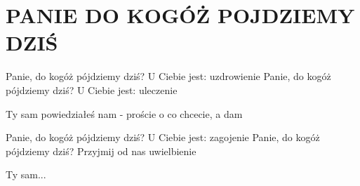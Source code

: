 \documentclass[../../../songbook.tex]{subfiles}
\begin{document}
\TabPositions{8cm} %
\section*{PANIE DO KOGÓŻ POJDZIEMY DZIŚ}
{}
\vspace{0.5cm}
Panie, do kogóż pójdziemy dziś?		 \newline
U Ciebie jest: uzdrowienie			 \newline
Panie, do kogóż pójdziemy dziś? \newline
U Ciebie jest: uleczenie \newline

\-\hspace{1cm} Ty sam powiedziałeś nam -	 \newline
\-\hspace{1cm} proście o co chcecie, a dam	 \newline

Panie, do kogóż pójdziemy dziś? \newline
U Ciebie jest: zagojenie \newline
Panie, do kogóż pójdziemy dziś? \newline
Przyjmij od nas uwielbienie \newline

\-\hspace{1cm} Ty sam... \newline
\end{document}
